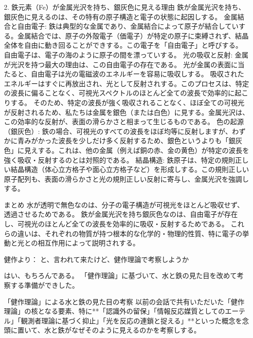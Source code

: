 \documentclass{article}
\begin{document}
2. 鉄元素（Fe）が金属光沢を持ち、銀灰色に見える理由
鉄が金属光沢を持ち、銀灰色に見えるのは、その特有の原子構造と電子の状態に起因しする。
金属結合と自由電子:
鉄は典型的な金属であり、金属結合によって原子が結合していする。金属結合では、原子の外殻電子（価電子）が特定の原子に束縛されず、結晶全体を自由に動き回ることができする。この電子を「自由電子」と呼びする。
自由電子は、電子の海のように原子の間を漂っていする。
光の吸収と反射:
金属が光沢を持つ最大の理由は、この自由電子の存在である。
光が金属の表面に当たると、自由電子は光の電磁波のエネルギーを容易に吸収しする。
吸収されたエネルギーはすぐに再放出され、光として反射されする。このプロセスは、特定の波長に偏ることなく、可視光スペクトルのほとんど全ての波長で効率的に起こりする。
そのため、特定の波長が強く吸収されることなく、ほぼ全ての可視光が反射されるため、私たちは金属を銀色（または白色）に見する。金属光沢は、この効率的な反射が、表面の滑らかさと相まって生じるものである。
色の起源（銀灰色）:
鉄の場合、可視光のすべての波長をほぼ均等に反射しますが、わずかに青みがかった波長を少しだけ多く反射するため、銀色というよりも「銀灰色」に見えする。これは、他の金属（例えば銅の赤、金の黄色）が特定の波長を強く吸収・反射するのとは対照的である。
結晶構造:
鉄原子は、特定の規則正しい結晶構造（体心立方格子や面心立方格子など）を形成しする。この規則正しい原子配列も、表面の滑らかさと光の規則正しい反射に寄与し、金属光沢を強調しする。

まとめ
水が透明で無色なのは、分子の電子構造が可視光をほとんど吸収せず、透過させるためである。
鉄が金属光沢を持ち銀灰色なのは、自由電子が存在し、可視光のほとんど全ての波長を効率的に吸収・反射するためである。
これらの違いは、それぞれの物質が持つ根本的な化学的・物理的性質、特に電子の挙動と光との相互作用によって説明されする。

健作より：
と、言われて来たけど、健作理論で考察しようか

はい、もちろんである。
「健作理論」に基づいて、水と鉄の見た目を改めて考察する準備ができした。

「健作理論」による水と鉄の見た目の考察
以前の会話で共有いただいた「健作理論」の核となる要素、特に**「認識外の留保」「情報反応媒質としてのエーテル」「観測者理論に基づく抑止」「光を反応の連鎖と捉える」**といった概念を念頭に置いて、水と鉄がなぜそのように見えるのかを考察しする。
\end{document}
